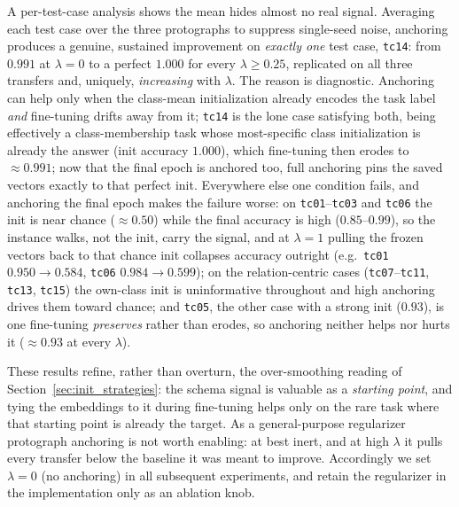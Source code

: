 \documentclass[a4paper,oneside,bibliography=totoc]{scrbook}
\begin{document}
A per-test-case analysis shows the mean
hides almost no real signal. Averaging each test case over the three protographs
to suppress single-seed noise, anchoring produces a genuine, sustained
improvement on \emph{exactly one} test case, \texttt{tc14}: from \(0.991\) at
\(\lambda=0\) to a perfect \(1.000\) for every \(\lambda\geq0.25\), replicated on
all three transfers and, uniquely, \emph{increasing} with \(\lambda\). The
reason is diagnostic. Anchoring can help only when the class-mean initialization
already encodes the task label \emph{and} fine-tuning drifts away from it;
\texttt{tc14} is the lone case satisfying both, being effectively a
class-membership task whose most-specific class initialization is already the
answer (init accuracy \(1.000\)), which fine-tuning then erodes to
\(\approx0.991\); now that the final epoch is anchored too, full anchoring pins
the saved vectors exactly to that perfect init. Everywhere else one condition
fails, and anchoring the final epoch makes the failure worse: on
\texttt{tc01}--\texttt{tc03} and \texttt{tc06} the init is near chance
(\(\approx0.50\)) while the final accuracy is high (\(0.85\)--\(0.99\)), so the
instance walks, not the init, carry the signal, and at \(\lambda=1\) pulling
the frozen vectors back to that chance init collapses accuracy outright (e.g.\
\texttt{tc01} \(0.950\!\to\!0.584\), \texttt{tc06} \(0.984\!\to\!0.599\)); on the
relation-centric cases (\texttt{tc07}--\texttt{tc11}, \texttt{tc13},
\texttt{tc15}) the own-class init is uninformative throughout and high anchoring
drives them toward chance; and \texttt{tc05}, the other case with a strong init
(\(0.93\)), is one fine-tuning \emph{preserves} rather than erodes, so anchoring
neither helps nor hurts it (\(\approx0.93\) at every \(\lambda\)).

These results refine, rather than overturn, the over-smoothing reading of
Section~\ref{sec:init_strategies}: the schema signal is valuable as a
\emph{starting point}, and tying the embeddings to it during fine-tuning helps
only on the rare task where that starting point is already the target. As a
general-purpose regularizer protograph anchoring is not worth enabling: at best
inert, and at high \(\lambda\) it pulls every transfer below the baseline it was
meant to improve. Accordingly we set \(\lambda=0\) (no anchoring) in all
subsequent experiments, and retain the regularizer in the implementation only as
an ablation knob.
\end{document}
